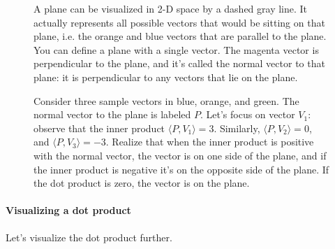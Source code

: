 \documentclass[12pt]{article}
\begin{document}
\begin{figure}
  \begin{center}
  \end{center}
  \caption{A plane can be visualized in 2-D space by a dashed gray line. It actually represents all possible vectors that would be sitting on that plane, i.e. the orange and blue vectors that are parallel to the plane. You can define a plane with a single vector. The magenta vector is perpendicular to the plane, and it's called the normal vector to that plane: it is perpendicular to any vectors that lie on the plane.}
\end{figure}

\begin{figure}
  \begin{center}
  \end{center}
  \caption{Consider three sample vectors in blue, orange, and green. The normal vector to the plane is labeled $P$. Let's focus on vector $V_1$: observe that the inner product $\langle P, V_1 \rangle = 3$. Similarly, $\langle P, V_2 \rangle = 0$, and $\langle P, V_3 \rangle = -3$. Realize that when the inner product is positive with the normal vector, the vector is on one side of the plane, and if the inner product is negative it's on the opposite side of the plane. If the dot product is zero, the vector is on the plane.}
\end{figure}

\paragraph{Visualizing a dot product} Let's visualize the dot product further.
\end{document}
